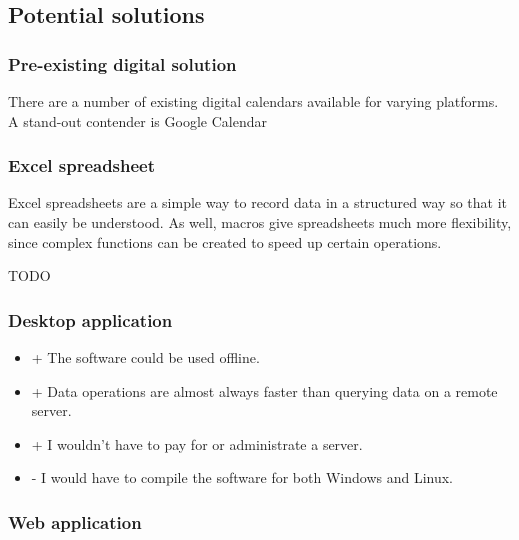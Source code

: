\subsection{Potential solutions}

\newcommand{\solreq}[1]{\thead{#1}&}
\newcommand{\solreqlast}[1]{\thead{#1} \\}
\newcommand{\solname}[1]{\thead{#1}&}
\newcommand{\solY}{\multicolumn{1}{c|}{Yes}}
\newcommand{\solN}{\multicolumn{1}{c|}{No}}


\subsubsection{Pre-existing digital solution}

There are a number of existing digital calendars available for varying
platforms. A stand-out contender is Google Calendar

\subsubsection{Excel spreadsheet}

Excel spreadsheets are a simple way to record data in a structured way so that
it can easily be understood. As well, macros give spreadsheets much more
flexibility, since complex functions can be created to speed up certain
operations.

TODO

\subsubsection{Desktop application}

\begin{itemize}
  \item + The software could be used offline.
  \item + Data operations are almost always faster than querying data on a
          remote server.
  \item + I wouldn't have to pay for or administrate a server.
  \item - I would have to compile the software for both Windows and Linux.
\end{itemize}



\subsubsection{Web application}

